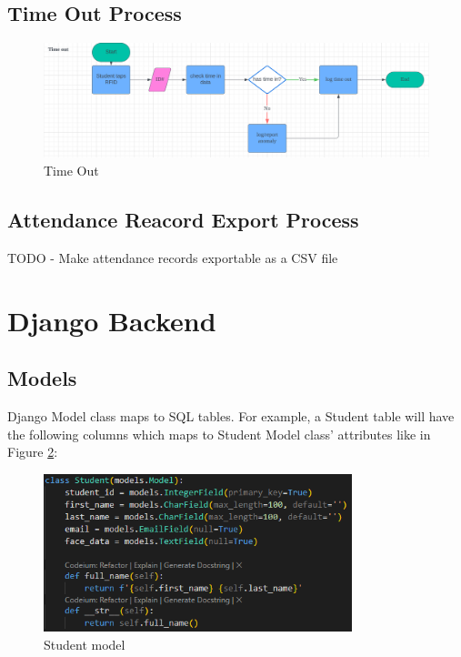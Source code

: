 \subsection{Time Out Process}
\begin{figure}[h] %
	\centering
	\includegraphics[width=1.0\textwidth]{figures/chapter4/timeout.png} %
	\caption{Time Out}
	\label{fig:timeout}
\end{figure}

\subsection{Attendance Reacord Export Process}
	TODO - Make attendance records exportable as a CSV file

\section{Django Backend}
\subsection{Models}
	Django Model class maps to SQL tables. For example, a Student table will have the following columns which maps to Student Model class' attributes like in Figure \ref{fig:models}: 
	
	\begin{figure}[h] %
		\centering
		\includegraphics[width=0.8\textwidth]{figures/chapter4/models.png} %
		\caption{Student model}
		\label{fig:models}
	\end{figure}
	
